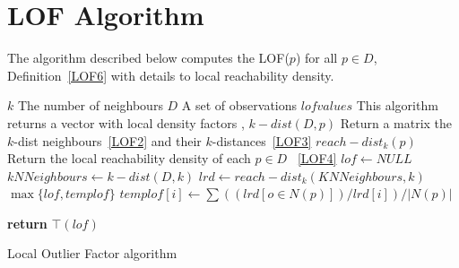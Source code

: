 \section{LOF Algorithm}
The algorithm described below \citep{Malak} computes the LOF($p$) for all $p \in D$, Definition~\ref{LOF6} with details to local reachability density.
\begin{algorithm}[H]
  \begin{algorithmic}[1]
  \INPUT{}  
  \Statex $k$ \Comment The number of neighbours
  \Statex $D$  \Comment A set of observations
  \OUTPUT{}  
    \Statex $lof values$ \Comment This algorithm returns a vector with local density factors
   \ASSUME,  
   \Statex $k-dist(D,p)$ \Comment Return a matrix the $k$-dist neighbours~\ref{LOF2} and their $k$-distances~\ref{LOF3}
   \Statex $reach-dist_k(p)$  \Comment Return the local reachability density of each $p \in D$ ~\ref{LOF4}    
    \State $lof \gets NULL$       
              \State $kNNeighbours \gets k-dist(D,k)$
              \State $lrd \gets reach-dist_k(KNNeighbours,k)$        
			             \State $\max \lbrace lof,templof \rbrace$ 
		                 \State $templof[i] \gets \sum ((lrd[o \in N(p)]) / lrd[i])/ |N(p)|$
		                 
                   \EndFor\label{loffor}        
            \EndFor\label{loffor}    
    \State \textbf{return} $\top(lof)$
    \EndProcedure
  \end{algorithmic}
  \caption{Local Outlier Factor algorithm}\label{lof}
\end{algorithm}
     \begin{comment}    
    \FOR{each point $p$}\Comment{We have the answer if r is 0}
      \State $kNNeighbours \gets k-dist(D,k)$
      \State $lrd \gets reach-dist_k(KNNeighbours,k)$

     \FOR{each $p$ in kNNeigbours}
               \State $templof[i] \gets \sum ((lrd[o \in N(p)]) / lrd[i])/ |N(p)|$
               \State $\max \lbrace lof,templof \rbrace$
           \EndFor\label{loffor}

    \EndFor\label{loffor}
     \end{comment}  

